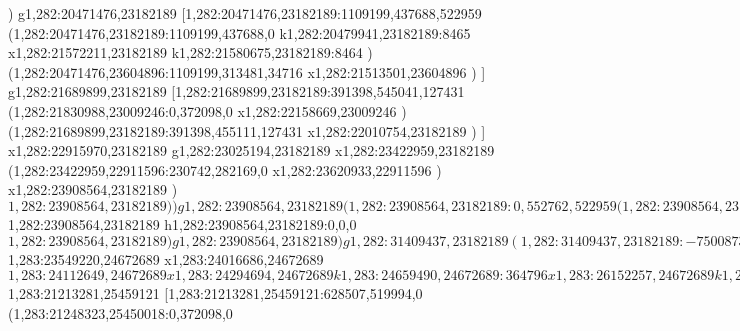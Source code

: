 {)
g1,282:20471476,23182189
[1,282:20471476,23182189:1109199,437688,522959
(1,282:20471476,23182189:1109199,437688,0
k1,282:20479941,23182189:8465
x1,282:21572211,23182189
k1,282:21580675,23182189:8464
)
(1,282:20471476,23604896:1109199,313481,34716
x1,282:21513501,23604896
)
]
g1,282:21689899,23182189
[1,282:21689899,23182189:391398,545041,127431
(1,282:21830988,23009246:0,372098,0
x1,282:22158669,23009246
)
(1,282:21689899,23182189:391398,455111,127431
x1,282:22010754,23182189
)
]
x1,282:22915970,23182189
g1,282:23025194,23182189
x1,282:23422959,23182189
(1,282:23422959,22911596:230742,282169,0
x1,282:23620933,22911596
)
x1,282:23908564,23182189
)
$1,282:23908564,23182189
)
)
g1,282:23908564,23182189
(1,282:23908564,23182189:0,552762,522959
(1,282:23908564,23182189:0,0,0
$1,282:23908564,23182189
h1,282:23908564,23182189:0,0,0
$1,282:23908564,23182189
)
g1,282:23908564,23182189
)
g1,282:31409437,23182189
(1,282:31409437,23182189:-7500873,552762,522959
)
g1,282:23908564,23182189
)
(1,284:10437920,24672689:20971518,455111,127431
x1,284:11748642,24672689
x1,283:12094527,24672689
k1,283:12337488,24672689:242961
x1,283:12883623,24672689
x1,283:13211304,24672689
x1,283:14048711,24672689
x1,283:14580280,24672689
k1,283:14823242,24672689:242962
x1,283:16811173,24672689
k1,283:17054134,24672689:242961
x1,283:17381815,24672689
k1,283:17624776,24672689:242961
x1,283:19228591,24672689
k1,283:19471552,24672689:242961
x1,283:21878186,24672689
k1,283:22121148,24672689:242962
x1,283:22448829,24672689
x1,283:22776510,24672689
x1,283:23306259,24672689
k1,283:23549220,24672689:242961
$1,283:23549220,24672689
x1,283:24016686,24672689
$1,283:24112649,24672689
x1,283:24294694,24672689
k1,283:24659490,24672689:364796
x1,283:26152257,24672689
k1,283:26395218,24672689:242961
x1,283:27086989,24672689
k1,283:27329950,24672689:242961
x1,283:28058130,24672689
x1,283:29314240,24672689
k1,283:29557202,24672689:242962
x1,283:30725929,24672689
k1,283:30968890,24672689:242961
x1,283:31409438,24672689
k1,283:31409438,24672689:0
)
(1,284:10437920,25459121:20971518,519994,127431
x1,284:11093281,25459121
x1,284:12476822,25459121
k1,283:12688318,25459121:211496
x1,283:13274502,25459121
k1,283:13485999,25459121:211497
x1,283:14396223,25459121
k1,283:14607719,25459121:211496
x1,283:15590761,25459121
x1,283:15918442,25459121
x1,283:16537394,25459121
k1,283:16748890,25459121:211496
x1,283:17913977,25459121
x1,283:20262357,25459121
k1,283:20473854,25459121:211497
x1,283:21001785,25459121
k1,283:21213281,25459121:211496
$1,283:21213281,25459121
[1,283:21213281,25459121:628507,519994,0
(1,283:21248323,25450018:0,372098,0
}
